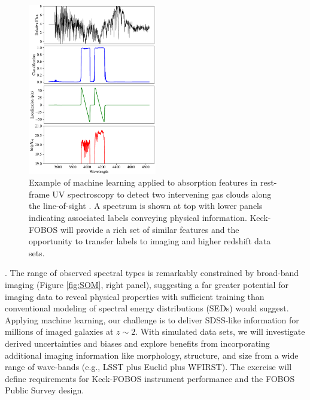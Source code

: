 \documentclass[oneside,11pt]{amsart}
\newcounter{chalno}
\newcommand{\chal}[1]{\refstepcounter{chalno}\label{#1}}
\begin{document}
\begin{figure}[h!]
%
\vskip -0.1in
%
\includegraphics[width=0.5\textwidth]{Parks18_Fig7_fig_labels.pdf}
%
\caption{\small Example of machine learning applied to absorption
features in rest-frame UV spectroscopy to detect two intervening gas
clouds along the line-of-sight \citep[from][]{parks18}.  A spectrum is
shown at top with lower panels indicating associated labels conveying
physical information.  Keck-FOBOS will provide a rich set of similar
features and the opportunity to transfer labels to imaging and higher
redshift data sets.}
%
\label{fig:absorber}
%
\end{figure}

\medskip
%
\chal{phot}
%
.  The range
of observed spectral types is remarkably constrained by broad-band
imaging (Figure \ref{fig:SOM}, right panel), suggesting a far greater
potential for imaging data to reveal physical properties with sufficient
training than conventional modeling of spectral energy distributions
(SEDs) would suggest.  Applying machine learning, our challenge is to
deliver SDSS-like information for millions of imaged galaxies at $z \sim
2$.  With simulated data sets, we will investigate derived uncertainties
and biases and explore benefits from incorporating additional imaging
information like morphology, structure, and size from a wide range of
wave-bands (e.g., LSST plus Euclid plus WFIRST).  The exercise will
define requirements for Keck-FOBOS instrument performance and the FOBOS
Public Survey design.
\end{document}
